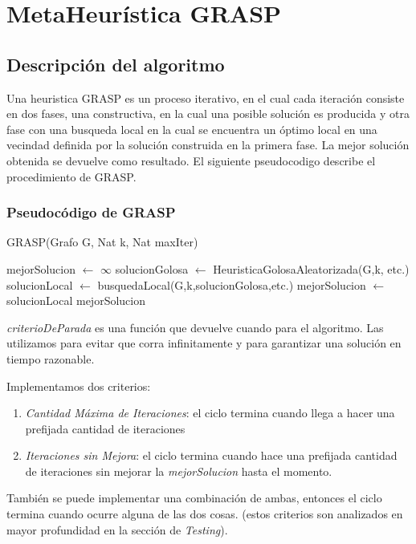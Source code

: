 \section{MetaHeurística GRASP}
\subsection{Descripción del algoritmo}
Una heuristica GRASP es un proceso iterativo, en el cual cada iteración consiste en dos fases, una constructiva, en la cual una posible solución es producida y otra fase con una busqueda local en la cual se encuentra un óptimo local en una vecindad definida por la solución construida en la primera fase.
La mejor solución obtenida se devuelve como resultado.
El siguiente pseudocodigo describe el procedimiento de GRASP.

\subsubsection{Pseudocódigo de GRASP}
\begin{algorithm}[H]
\begin{algorithmic}[1]
\caption{GRASP(Grafo G, Nat k, Nat maxIter)}
\STATE mejorSolucion $\leftarrow$ $\infty$
    \STATE solucionGolosa $\leftarrow$ HeuristicaGolosaAleatorizada(G,k, etc.)
    \STATE solucionLocal $\leftarrow$ busquedaLocal(G,k,solucionGolosa,etc.)
        \STATE mejorSolucion $\leftarrow$ solucionLocal 
    \ENDIF
\ENDWHILE
\RETURN mejorSolucion
\end{algorithmic}
\end{algorithm}

\textit{criterioDeParada} es una función que devuelve cuando para el algoritmo. Las utilizamos para evitar que corra infinitamente y para garantizar una solución en tiempo razonable. 

Implementamos dos criterios:
\begin{enumerate}
    \item \textit{Cantidad Máxima de Iteraciones}: el ciclo termina cuando llega a hacer una prefijada cantidad de iteraciones 
    \item \textit{Iteraciones sin Mejora}: el ciclo termina cuando hace una prefijada cantidad de iteraciones sin mejorar la \textit{mejorSolucion} hasta el momento.
\end{enumerate} 
También se puede implementar una combinación de ambas, entonces el ciclo termina cuando ocurre alguna de las dos cosas. (estos criterios son analizados en mayor profundidad en la sección de \textit{Testing}).

